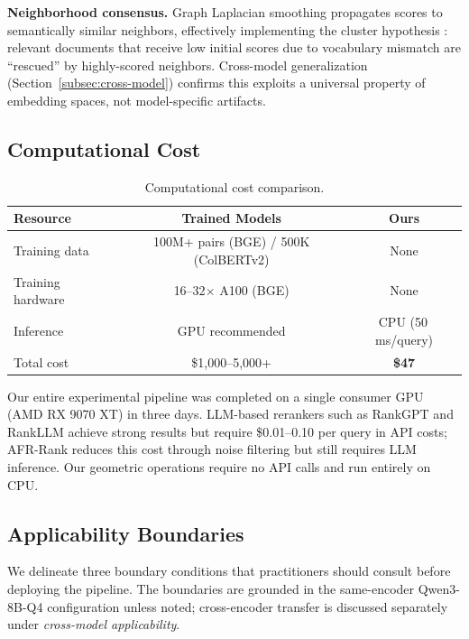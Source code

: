 \documentclass[review,1p]{elsarticle}
\begin{document}
\textbf{Neighborhood consensus.} Graph Laplacian smoothing propagates scores to semantically similar neighbors, effectively implementing the cluster hypothesis \citep{vanrijsbergen1979ir}: relevant documents that receive low initial scores due to vocabulary mismatch are ``rescued'' by highly-scored neighbors. Cross-model generalization (Section~\ref{subsec:cross-model}) confirms this exploits a universal property of embedding spaces, not model-specific artifacts.

\subsection{Computational Cost}
\label{subsec:cost}

\begin{table}[ht]
\centering
\caption{Computational cost comparison.}
\label{tab:cost}
\footnotesize
\begin{tabular}{lcc}
\toprule
Resource & Trained Models & Ours \\
\midrule
Training data & 100M+ pairs (BGE) / 500K (ColBERTv2) & None \\
Training hardware & 16--32$\times$ A100 (BGE) & None \\
Inference & GPU recommended & CPU (50\,ms/query) \\
Total cost & \$1,000--5,000+ & \textbf{\$47} \\
\bottomrule
\end{tabular}
\end{table}

Our entire experimental pipeline was completed on a single consumer GPU (AMD RX 9070 XT) in three days. LLM-based rerankers such as RankGPT \citep{sun2024rankgpt} and RankLLM \citep{pradeep2025rankllm} achieve strong results but require \$0.01--0.10 per query in API costs; AFR-Rank \citep{afrrank2025} reduces this cost through noise filtering but still requires LLM inference. Our geometric operations require no API calls and run entirely on CPU.

\subsection{Applicability Boundaries}
\label{subsec:boundaries}

We delineate three boundary conditions that practitioners should consult before deploying the pipeline. The boundaries are grounded in the same-encoder Qwen3-8B-Q4 configuration unless noted; cross-encoder transfer is discussed separately under \emph{cross-model applicability}.
\end{document}
